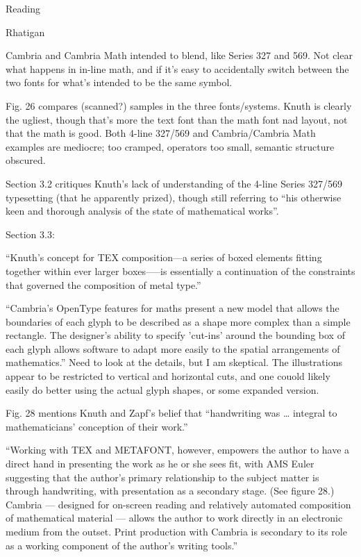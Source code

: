 \documentclass[11pt]{PalisadesLakesBook}
\begin{document}
\begin{plSection}{Reading}
\begin{plSection}{Rhatigan}
\begin{plSection}{}
\begin{plSection}{}
Cambria and Cambria Math intended to blend, 
like Series 327 and 569.
Not clear what happens in in-line math,
and if it's easy to accidentally switch
between the two fonts for what's intended to be the same symbol.

Fig. 26 compares (scanned?) samples in the three fonts/systems.
Knuth is clearly the ugliest, though that's more the text font
than the math font nad layout, not that the math is good.
Both 4-line 327/569 and Cambria/Cambria Math examples
are mediocre; too cramped, operators too small, semantic structure
obscured.

Section 3.2 critiques Knuth's lack of understanding of the 4-line
Series 327/569 typesetting (that he apparently prized),
though still referring to 
``his otherwise keen and thorough analysis 
of the state of mathematical works''.

Section 3.3:

``Knuth's concept for TEX composition---a series of boxed elements 
fitting together within ever larger boxes--—is essentially 
a continuation of the constraints that governed 
the composition of metal type.''

``Cambria's OpenType features for maths present a new model 
that allows the boundaries of each glyph to be described 
as a shape more complex than a simple rectangle. 
The designer's ability to specify 'cut-ins' 
around the bounding box of each glyph allows software 
to adapt more easily to the spatial arrangements of mathematics.''
Need to look at the details, but I am skeptical.
The illustrations appear to be restricted to vertical and
horizontal cuts, and one couold likely easily do better using
the actual glyph shapes, or some expanded version.

Fig. 28 mentions Knuth and Zapf's belief that 
``handwriting was {\ldots} integral 
to mathematicians' conception of their work.''

``Working with TEX and METAFONT, 
however, empowers the author to have a direct hand 
in presenting the work as he or she sees fit, 
with AMS Euler suggesting that the author's primary relationship 
to the subject matter is through handwriting, 
with presentation as a secondary stage. (See figure 28.) 
Cambria — designed for on-screen reading 
and relatively automated composition of mathematical 
material — allows the author to work directly 
in an electronic medium from the outset. 
Print production with Cambria is secondary to its role 
as a working component of the author's writing tools.''


\end{plSection}
\end{plSection}
\end{plSection}
\end{plSection}
\end{document}
